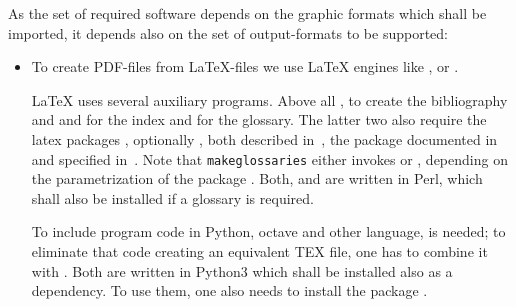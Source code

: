 As the set of required software depends on the graphic formats 
which shall be imported, 
it depends also on the set of output-formats 
to be supported: 
%
\begin{itemize}
\item
To create PDF-files from \LaTeX-files we use \LaTeX{} engines like 
\lualatex{}, \xelatex{} or \pdflatex{}. 

\LaTeX{} uses several auxiliary programs. 
Above all , to create the bibliography 
and  
and  for the index 
and  for the glossary. 
The latter two 
also require the latex packages , optionally , 
both described in~\cite{MkidxShIdxP}, 
the package  documented in~\cite{SplitidxP}
and  specified in~\cite{GloP4_54}. 
Note that \texttt{makeglossaries} either invokes  
or , depending on the parametrization of the package . 
Both,  and  are written in Perl, 
which shall also be installed if a glossary is required. 

To include program code in Python, octave and other language, 
 is needed; 
to eliminate that code creating an equivalent TEX file, 
one has to combine it with . 
Both are written in Python3 which shall be installed also as a dependency. 
To use them, one also needs to install the package . 




\end{itemize}
